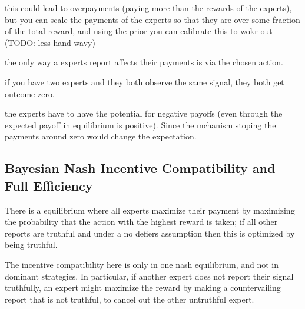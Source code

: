 

this could lead to overpayments (paying more than the rewards of the experts), but you can scale the payments of the experts so that they are over some fraction of the total reward, and using the prior you can calibrate this to wokr out (TODO: less hand wavy)

\begin{lem}
	the only way a experts report affects their payments is via the chosen action.
\end{lem}

\begin{eg}
	if you have two experts and they both observe the same signal, they both get outcome zero. 
\end{eg}



the experts have to have the potential for negative payoffs (even through the expected payoff in equilibrium is positive). Since the mchanism stoping the payments around zero would change the expectation. 


\subsection{Bayesian Nash Incentive Compatibility and Full Efficiency}

There is a  equilibrium where all experts maximize their payment by maximizing the probability that the action with the highest reward is taken; if all other reports are truthful and under a no defiers assumption then this is optimized by being truthful.


The incentive compatibility here is only in one nash equilibrium, and not in dominant strategies. In particular, if another expert does not report their signal truthfully, an expert might maximize the reward by making a countervailing report that is not truthful, to cancel out the other untruthful expert. 

